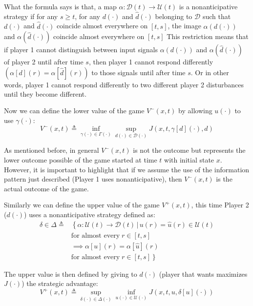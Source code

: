 What the formula says is that, a map $\alpha : \mathcal{D}(t) \rightarrow \mathcal{U}(t)$ is a nonanticipative strategy if for any $s \geq t$, for any $d(\cdot)$ and $\hat{d}(\cdot)$ belonging to $\mathcal{D}$ such that $d(\cdot)$ and $\hat{d}(\cdot)$ coincide almost everywhere on $[t,s]$, the image $\alpha(d(\cdot))$ and $\alpha(\hat{d}(\cdot))$ coincide almost everywhere on $[t,s]$ This restriction means that if player 1 cannot distinguish between input signals $ \alpha (d( \cdot )) $ and $ \alpha (\hat{d}( \cdot ) )$ of player 2 until after time $s$, then player 1 cannot respond differently $( \alpha [d](r) = \alpha [\hat{d}](r))$ to those signals until after time $s$. Or in other words, player 1 cannot respond differently to two different player 2 disturbances until they become different.

Now we can define the lower value of the game $V^-(x,t)$ by allowing $u(\cdot)$ to use $\gamma(\cdot)$:
\begin{equation}
	\label{lower_value_game}
	V^-(x,t) \triangleq \inf_{\gamma(\cdot) \in \Gamma(\cdot)}\sup_{d(\cdot) \in \mathcal{D}(\cdot)}J(x,t, \gamma[d](\cdot), d)
\end{equation}

As mentioned before, in general $V^-(x,t)$ is not the outcome but represents the lower outcome possible of the game started at time $t$ with initial state $x$. However, it is important to highlight that if we assume the use of the information pattern just described (Player 1 uses nonanticipative), then $V^-(x,t)$ is the actual outcome of the game.

Similarly we can define the upper value of the game $V^+(x,t)$, this time Player 2 ($d(\cdot)$) uses a nonanticipative strategy defined as:
\begin{equation}
	\label{eq:non_ant_stra_d}
	\begin{split}
		\delta \in \Delta \triangleq 
		& \left\{ 
			\alpha : \mathcal{U}(t) \rightarrow \mathcal{D}(t)\,|\,u(r) = \hat{u}(r) \in \mathcal{U}(t)
		\right. \\ 
		& \textrm{for almost every} \;r \in [t,s] \\
		& \implies \alpha[u](r)= \alpha[\hat{u}](r) \\
		& \left. 
			\textrm{for almost every} \; r \in [t,s] 
		\right\}  
	\end{split}
\end{equation}

The upper value is then defined by giving to $d(\cdot)$ (player that wants maximizes $J(\cdot)$) the strategic advantage:
\begin{equation}
	\label{upper_value_game}
	V^+(x,t) \triangleq \sup_{\delta(\cdot) \in \Delta(\cdot)}\inf_{u(\cdot) \in \mathcal{U}(\cdot)} J(x,t, u, \delta[u](\cdot))
\end{equation}

